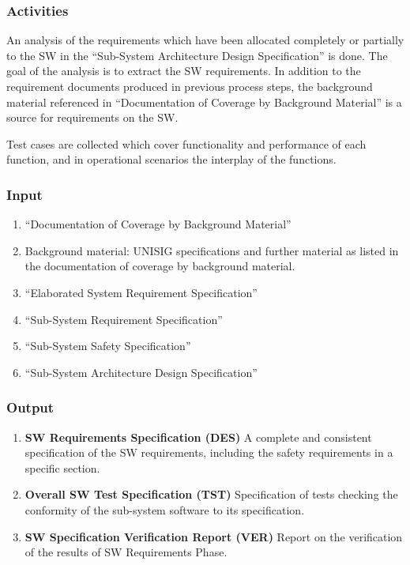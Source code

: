 \documentclass{template/openetcs_article}
\begin{document}
\subsubsection{Activities}
\label{sec:3-activities}

An analysis of the requirements which have been allocated completely
or partially to the SW in the ``Sub-System Architecture Design
Specification'' is done. The goal of the analysis is to extract the SW
requirements. In addition to the requirement documents produced in
previous process steps, the background material referenced in
``Documentation of Coverage by Background Material'' is a source for
requirements on the SW. 

Test cases are collected which cover functionality and performance of
each function, and in operational scenarios the interplay of the
functions.

\subsubsection{Input}
\label{sec:3-input}

\begin{enumerate}
\item ``Documentation of Coverage by Background Material''
\item Background material: UNISIG specifications
  \cite{subset-026:3.3.0, subset-034:3.0.0, subset-076:2.3, subset-088:2.3.0,
    subset-091:3.2.0} and further material as listed in
  the documentation of coverage by background material.
\item ``Elaborated System Requirement Specification''
\item ``Sub-System Requirement Specification''
\item ``Sub-System Safety Specification''
\item ``Sub-System Architecture Design Specification''
\end{enumerate}

\subsubsection{Output}
\label{sec:3-output}

\begin{enumerate}
\item \textbf{SW Requirements Specification (DES)} A complete and consistent
  specification of the SW requirements, including the safety
  requirements in a specific section. 
\item \textbf{Overall SW Test Specification (TST)} Specification of tests
  checking the conformity of the sub-system software to its specification. 
\item \textbf{SW Specification Verification Report (VER)} Report on the
  verification of the results of SW Requirements Phase.
\end{enumerate}
\end{document}
